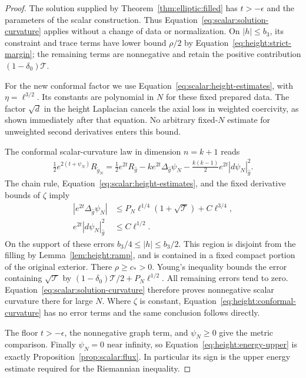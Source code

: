 \begin{proof}
The solution supplied by Theorem~\ref{thm:elliptic:filled} has
$t>-\epsilon$ and the parameters of the scalar construction. Thus
Equation~\eqref{eq:scalar:solution-curvature} applies without a change
of data or normalization. On $|h|\le b_3$, its constraint and trace
terms have lower bound $\rho/2$ by
Equation~\eqref{eq:height:strict-margin}; the remaining terms are
nonnegative and retain the positive contribution
$(1-\delta_0)\mathcal T$.

For the new conformal factor we use
Equation~\eqref{eq:scalar:height-estimates}, with
$\eta=\ell^{3/2}$. Its constants are polynomial in $N$ for these
fixed prepared data. The factor $\sqrt d$ in the height Laplacian
cancels the axial loss in weighted coercivity, as shown immediately
after that equation. No arbitrary fixed-$N$ estimate for unweighted
second derivatives enters this bound.

The conformal scalar-curvature law in dimension $n=k+1$ reads
\begin{align}\label{eq:height:conformal-curvature}
 \tfrac12e^{2(t+\psi_N)}R_{\widetilde g_N}
 =\tfrac12e^{2t}R_{\widehat g}
 -k e^{2t}\Delta_{\widehat g}\psi_N
 -\tfrac{k(k-1)}2e^{2t}|d\psi_N|_{\widehat g}^2.
\end{align}
The chain rule, Equation~\eqref{eq:scalar:height-estimates}, and the fixed derivative bounds of
$\zeta$ imply
\begin{align*}
 |e^{2t}\Delta_{\widehat g}\psi_N|
 &\le P_N\ell^{1/4}(1+\sqrt{\mathcal T})+C\ell^{3/4},\\
 e^{2t}|d\psi_N|_{\widehat g}^2&\le C\ell^{1/2}.
\end{align*}
On the support of these errors $b_3/4\le|h|\le b_3/2$.  This region
is disjoint from the filling by Lemma~\ref{lem:height:ramp}, and is
contained in a fixed compact portion of the original exterior.  There
$\rho\ge c_*>0$.  Young's inequality bounds the error containing
$\sqrt{\mathcal T}$ by
$(1-\delta_0)\mathcal T/2+P_N\ell^{1/2}$.  All remaining errors
tend to zero.  Equation~\eqref{eq:scalar:solution-curvature} therefore proves
nonnegative scalar curvature there for large $N$.  Where $\zeta$ is
constant, Equation~\eqref{eq:height:conformal-curvature} has no error
terms and the same conclusion follows directly.

The floor $t>-\epsilon$, the nonnegative graph term, and
$\psi_N\ge0$ give the metric comparison.  Finally $\psi_N=0$ near
infinity, so Equation~\eqref{eq:height:energy-upper} is exactly
Proposition~\ref{prop:scalar:flux}.  In particular its sign is the
upper energy estimate required for the Riemannian inequality.
\end{proof}

